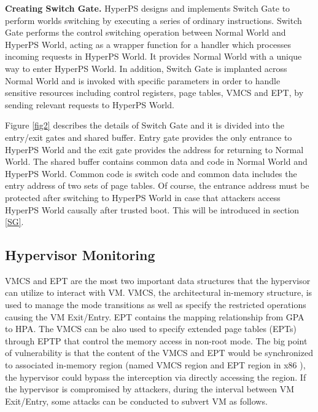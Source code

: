 \documentclass[conference]{IEEEtran}
\begin{document}
\textbf{Creating Switch Gate.}
HyperPS designs and implements Switch Gate to perform worlds switching by executing a series of ordinary instructions.
Switch Gate performs the control switching operation between Normal World and HyperPS World, acting as a wrapper function for a handler which processes incoming requests in HyperPS World. It provides Normal World with a unique way to enter HyperPS World. In addition, Switch Gate is implanted across Normal World and is invoked with specific parameters in order to handle sensitive resources including control registers, page tables, VMCS and EPT, by sending relevant requests to HyperPS World.

Figure \ref{fig2} describes the details of Switch Gate and it is divided into the entry/exit gates and shared buffer.
Entry gate provides the only entrance to HyperPS World and the exit gate provides the address for returning to Normal World. The shared buffer contains common data and code in Normal World and HyperPS World. Common code is switch code and common data includes the entry address of two sets of page tables.
 Of course, the entrance address must be protected after switching to HyperPS World in case that attackers access HyperPS World causally after trusted boot. This will be introduced in section \ref{SG}.


\subsection{Hypervisor Monitoring}\label {interaction}

 VMCS and EPT are the most two important data structures that the hypervisor can utilize to interact with VM. %
VMCS, the architectural in-memory structure, is used to manage the mode transitions as well as specify the restricted operations causing the VM Exit/Entry. EPT contains the mapping relationship from GPA to HPA. The VMCS can be also used to specify extended page tables (EPTs) through EPTP that control the memory access in non-root mode.
The big point of vulnerability is that the content of the VMCS and EPT would be synchronized to associated in-memory region (named VMCS region and EPT region in x86 ), the hypervisor could bypass the interception via directly accessing the region.
If the hypervisor is compromised by attackers, during the interval between VM Exit/Entry, some attacks can be conducted to subvert VM as follows. 
\end{document}
